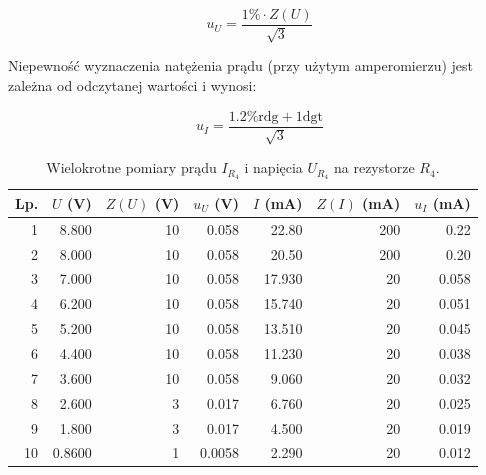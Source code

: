 \documentclass[a4paper]{article}
\newlength{\du}
\begin{document}
$$u_U = \frac{1\% \cdot Z(U)}{\sqrt{3}}$$

Niepewność wyznaczenia natężenia prądu (przy użytym amperomierzu) jest zależna od odczytanej wartości i wynosi:

$$u_I = \frac{1.2\% \text{rdg} + 1 \text{dgt}}{\sqrt{3}}$$

\begin{table}
\centering
\begin{tabular}{rrrrrrr}
\toprule
Lp. &  $U$ (V) &  $Z(U)$ (V) &  $u_U$ (V) &  $I$ (mA) &  $Z(I)$ (mA) &  $u_I$ (mA) \\
\midrule
1 &          8.800  &                10 &                 0.058  &             22.80  &                200 &                     0.22 \\
2 &          8.000  &                10 &                 0.058  &             20.50  &                200 &                     0.20 \\
3 &          7.000  &                10 &                 0.058  &             17.930 &                 20 &                     0.058 \\
4 &          6.200  &                10 &                 0.058  &             15.740 &                 20 &                     0.051 \\
5 &          5.200  &                10 &                 0.058  &             13.510 &                 20 &                     0.045 \\
6 &          4.400  &                10 &                 0.058  &             11.230 &                 20 &                     0.038 \\
7 &          3.600  &                10 &                 0.058  &              9.060 &                 20 &                     0.032 \\
8 &          2.600  &                 3 &                 0.017  &              6.760 &                 20 &                     0.025 \\
9 &          1.800  &                 3 &                 0.017  &              4.500 &                 20 &                     0.019 \\
10 &         0.8600 &                 1 &                 0.0058 &              2.290 &                 20 &                     0.012 \\
\bottomrule
\end{tabular}
\caption{Wielokrotne pomiary prądu $I_{R_4}$ i napięcia $U_{R_4}$ na rezystorze $R_4$.}
\label{pomiary_r4}
\end{table}
\end{document}
